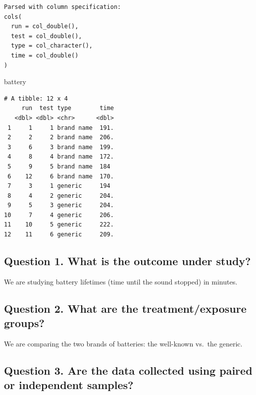 \documentclass[
]{book}
\newenvironment{Shaded}{\begin{snugshade}}{\end{snugshade}}
\newcommand{\NormalTok}[1]{#1}
\begin{document}
\begin{verbatim}
Parsed with column specification:
cols(
  run = col_double(),
  test = col_double(),
  type = col_character(),
  time = col_double()
)
\end{verbatim}

\begin{Shaded}
\begin{Highlighting}[]
\NormalTok{battery}
\end{Highlighting}
\end{Shaded}

\begin{verbatim}
# A tibble: 12 x 4
     run  test type        time
   <dbl> <dbl> <chr>      <dbl>
 1     1     1 brand name  191.
 2     2     2 brand name  206.
 3     6     3 brand name  199.
 4     8     4 brand name  172.
 5     9     5 brand name  184 
 6    12     6 brand name  170.
 7     3     1 generic     194 
 8     4     2 generic     204.
 9     5     3 generic     204.
10     7     4 generic     206.
11    10     5 generic     222.
12    11     6 generic     209.
\end{verbatim}

\hypertarget{question-1.-what-is-the-outcome-under-study}{%
\subsection{Question 1. What is the outcome under study?}\label{question-1.-what-is-the-outcome-under-study}}

We are studying battery lifetimes (time until the sound stopped) in minutes.

\hypertarget{question-2.-what-are-the-treatmentexposure-groups}{%
\subsection{Question 2. What are the treatment/exposure groups?}\label{question-2.-what-are-the-treatmentexposure-groups}}

We are comparing the two brands of batteries: the well-known vs.~the generic.

\hypertarget{question-3.-are-the-data-collected-using-paired-or-independent-samples}{%
\subsection{Question 3. Are the data collected using paired or independent samples?}\label{question-3.-are-the-data-collected-using-paired-or-independent-samples}}
\end{document}
